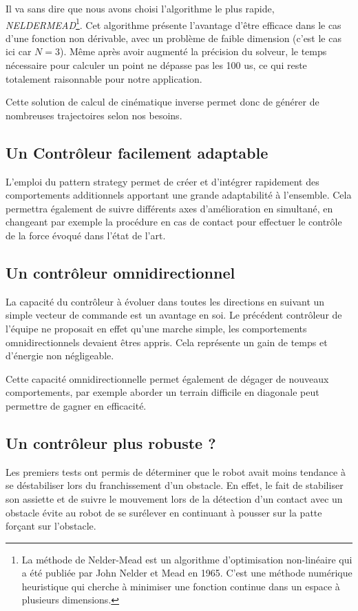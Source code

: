\documentclass{tnreport}
\begin{document}
Il va sans dire que nous avons choisi l'algorithme le plus rapide, \textit{NELDERMEAD}\footnote{La méthode de Nelder-Mead est un algorithme d'optimisation non-linéaire qui a été publiée par John Nelder et Mead en 1965. C'est une méthode numérique heuristique qui cherche à minimiser une fonction continue dans un espace à plusieurs dimensions.}. Cet algorithme présente l'avantage d'être efficace dans le cas d'une fonction non dérivable, avec un problème de faible dimension (c'est le cas ici car $N=3$). Même après avoir augmenté la précision du solveur, le temps nécessaire pour calculer un point ne dépasse pas les 100 us, ce qui reste totalement raisonnable pour notre application.

Cette solution de calcul de cinématique inverse permet donc de générer de nombreuses trajectoires selon nos besoins.

\subsection{Un Contrôleur facilement adaptable}

L'emploi du pattern strategy permet de créer et d'intégrer rapidement des comportements additionnels apportant une grande adaptabilité à l'ensemble. Cela permettra également de suivre différents axes d'amélioration en simultané, en changeant par exemple la procédure en cas de contact pour effectuer le contrôle de la force évoqué dans l'état de l'art.  

\subsection{Un contrôleur omnidirectionnel}
La capacité du contrôleur à évoluer dans toutes les directions en suivant un simple vecteur de commande est un avantage en soi. Le précédent contrôleur de l'équipe ne proposait en effet qu'une marche simple, les comportements omnidirectionnels devaient êtres appris. Cela représente un gain de temps et d'énergie non négligeable. 

Cette capacité omnidirectionnelle permet également de dégager de nouveaux comportements, par exemple aborder un terrain difficile en diagonale peut permettre de gagner en efficacité. 

\subsection{Un contrôleur plus robuste ?}

Les premiers tests ont permis de déterminer que le robot avait moins tendance à se déstabiliser lors du franchissement d'un obstacle. En effet, le fait de stabiliser son assiette et de suivre le mouvement lors de la détection d'un contact avec un obstacle évite au robot de se surélever en continuant à pousser sur la patte forçant sur l'obstacle. 
\end{document}

